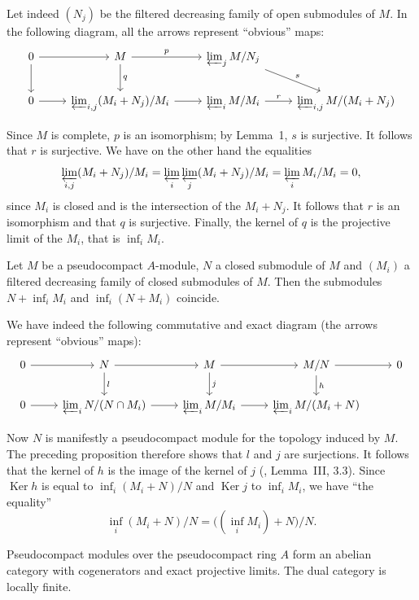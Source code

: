 Let indeed $(N_j)$ be the filtered decreasing family of open submodules
of $M$. In the following diagram, all the arrows represent
``obvious'' maps:
\[
\begin{tikzcd}
0 \arrow[r] \arrow[d] & M \arrow[r, "p"] \arrow[d, "q"] & \varprojlim_j M/N_j \arrow[dr, "s"] \\
0 \arrow[r] & \varprojlim_{i,j}(M_i+N_j)/M_i \arrow[r] & \varprojlim_i M/M_i \arrow[r, "r"] & \varprojlim_{i,j}M/(M_i+N_j)
\end{tikzcd}
\]

Since $M$ is complete, $p$ is an isomorphism; by Lemma~1, $s$ is
surjective. It follows that $r$ is surjective. We have on the other
hand the equalities
\[
\varprojlim_{i,j}(M_i+N_j)/M_i=\varprojlim_i\varprojlim_j(M_i+N_j)/M_i=\varprojlim_i M_i/M_i=0,
\]
since $M_i$ is closed and is the intersection of the $M_i+N_j$. It
follows that $r$ is an isomorphism and that $q$ is surjective. Finally,
the kernel of $q$ is the projective limit of the $M_i$, that is
$\inf_i M_i$.

\begin{proposition}
Let $M$ be a pseudocompact $A$-module, $N$ a closed submodule of $M$
and $(M_i)$ a filtered decreasing family of closed submodules of $M$.
Then the submodules $N+\inf_i M_i$ and $\inf_i(N+M_i)$ coincide.
\end{proposition}

We have indeed the following commutative and exact diagram (the arrows
represent ``obvious'' maps):
\[
\begin{tikzcd}
0 \arrow[r] & N \arrow[r] \arrow[d, "l"] & M \arrow[r] \arrow[d, "j"] & M/N \arrow[r] \arrow[d, "h"] & 0 \\
0 \arrow[r] & \varprojlim_i N/(N\cap M_i) \arrow[r] & \varprojlim_i M/M_i \arrow[r] & \varprojlim_i M/(M_i+N) &
\end{tikzcd}
\]

Now $N$ is manifestly a pseudocompact module for the topology induced
by $M$. The preceding proposition therefore shows that $l$ and $j$ are
surjections. It follows that the kernel of $h$ is the image of the
kernel of $j$ (\cite{cartan-eilenberg}, Lemma~III, 3.3). Since
$\operatorname{Ker}h$ is equal to $\inf_i(M_i+N)/N$ and
$\operatorname{Ker}j$ to $\inf_i M_i$, we have ``the equality''
\[
\inf_i(M_i+N)/N=\bigl((\inf_i M_i)+N\bigr)/N.
\]

\begin{theorem}
Pseudocompact modules over the pseudocompact ring $A$ form an abelian
category with cogenerators and exact projective limits. The dual
category is locally finite.
\end{theorem}

